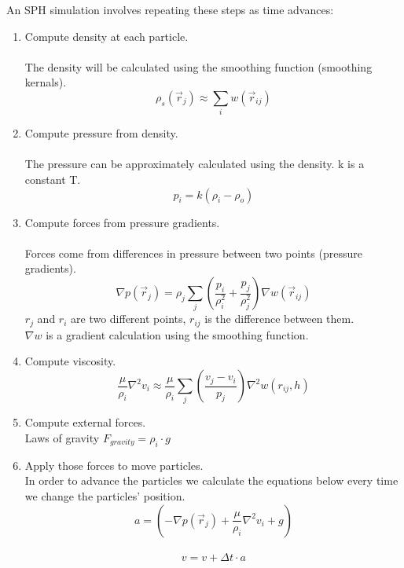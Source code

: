 \documentclass[a4paper,12pt,twoside,final]{report}
\begin{document}
\noindent An SPH simulation involves repeating these steps as time advances:
\begin{enumerate}

\item Compute density at each particle. \\ \\
\noindent The density will be calculated using the smoothing function (smoothing kernals).
\begin{equation}
{\rho_s}{(\overrightarrow r_j)} {\approx} {\sum_i}{w(\overrightarrow r_{ij})}
\label{e3}
\end{equation}

\item Compute pressure from density. \\ \\
\noindent The pressure can be approximately calculated using the density. k is a constant T.
\begin{equation}
{p_i} = {k(\rho_i -\rho_o)}
\label{e4}
\end{equation}

\item Compute forces from pressure gradients. \\ \\
\noindent Forces come from differences in pressure between two points (pressure gradients).
\begin{equation}
{\nabla p(\overrightarrow r_j)} =  {\rho_j}{\sum_j}(\frac{p_i}{\rho_i^2}+\frac{p_j}{\rho_j^2}){\nabla w(\overrightarrow r_{ij})}
\label{e5}
\end{equation}
\noindent $r_j$ and $r_i$ are two different points, $r_{ij}$ is the difference between them. \\
\noindent $\nabla w$ is a gradient calculation using the smoothing function.

\item Compute viscosity.
\begin{equation}
\frac{\mu}{\rho_i}{ \nabla^2 v_i} \approx \frac{\mu}{\rho_i}{\sum_j}(\frac{v_j - v_i}{p_j}){\nabla^2 w(r_{ij},h)}
\label{e6}
\end{equation}

\item Compute external forces. \\
\noindent Laws of gravity $F_{gravity}=\rho_i \cdot g$

\item Apply those forces to move particles. \\
\noindent In order to advance the particles we calculate the equations below every time we change the particles’ position.
\begin{equation}
{a} = {(-\nabla p(\overrightarrow r_j) + \frac{\mu}{\rho_i}{ \nabla^2 v_i} + g)}
\label{e7}
\end{equation} \\

\noindent \begin{equation}
{v} = {v + \Delta t \cdot a}
\label{e8}
\end{equation}

\end{enumerate}
\end{document}
